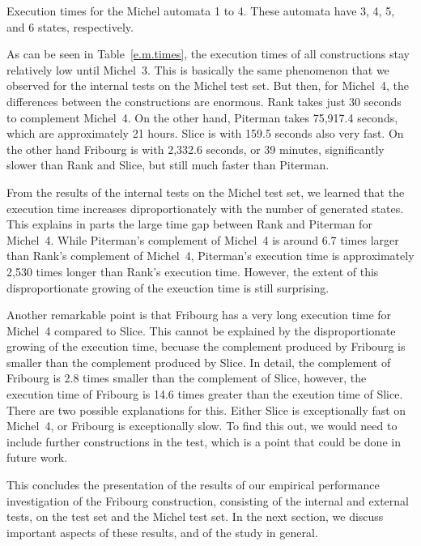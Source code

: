 \begin{table}[htb]
\centering

\caption{Execution times for the Michel automata 1 to 4. These automata have 3, 4, 5, and 6 states, respectively.}
\label{e.m.times}
\end{table}

As can be seen in Table~\ref{e.m.times}, the execution times of all constructions stay relatively low until Michel~3. This is basically the same phenomenon that we observed for the internal tests on the Michel test set. But then, for Michel~4, the differences between the constructions are enormous. Rank takes just 30 seconds to complement Michel~4. On the other hand, Piterman takes 75,917.4 seconds, which are approximately 21 hours. Slice is  with 159.5 seconds also very fast. On the other hand Fribourg is with 2,332.6 seconds, or 39 minutes, significantly slower than Rank and Slice, but still much faster than Piterman.

From the results of the internal tests on the Michel test set, we learned that the execution time increases diproportionately with the number of generated states. This explains in parts the large time gap between Rank and Piterman for Michel~4. While Piterman's complement of Michel~4 is around 6.7 times larger than Rank's complement of Michel~4, Piterman's execution time is approximately 2,530 times longer than Rank's execution time. However, the extent of this disproportionate growing of the exeuction time is still surprising.

Another remarkable point is that Fribourg has a very long execution time for Michel~4 compared to Slice. This cannot be explained by the disproportionate growing of the execution time, becuase the complement produced by Fribourg is smaller than the complement produced by Slice. In detail, the complement of Fribourg is 2.8 times smaller than the complement of Slice, however, the execution time of Fribourg is 14.6 times greater than the exeution time of Slice. There are two possible explanations for this. Either Slice is exceptionally fast on Michel~4, or Fribourg is exceptionally slow. To find this out, we would need to include further constructions in the test, which is a point that could be done in future work.

This concludes the presentation of the results of our empirical performance investigation of the Fribourg construction, consisting of the internal and external tests, on the \goal{} test set and the Michel test set. In the next section, we discuss important aspects of these results, and of the study in general.

